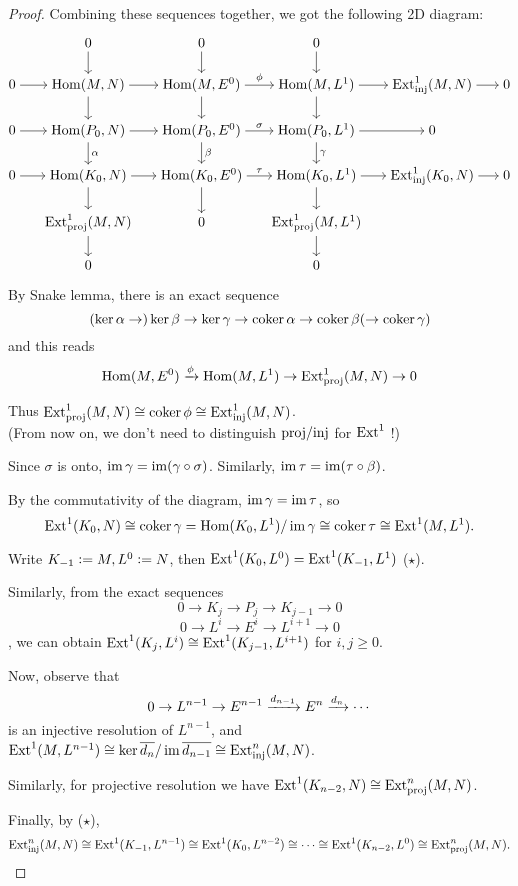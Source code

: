 \begin{theorem}
\begin{proof}
    Combining these sequences together, we got the following 2D diagram:

    $$
      \begin{tikzcd}[cramped, sep=15pt]
        & 0 \ar[d] & 0 \ar[d] & 0 \ar[d] \\
        0 \ar[r] & \Hom(M, N) \ar[r] \ar[d] & \Hom(M, E^0) \ar[r, "\phi"] \ar[d] &
        \Hom(M, L^1) \ar[r] \ar[d] & \Ext_\inj^1(M, N) \ar[r] & 0 \\
        0 \ar[r] & \Hom(P_0, N) \ar[r] \ar[d, "\alpha"] & \Hom(P_0, E^0) \ar[r, "\sigma"] \ar[d, "\beta"] &
        \Hom(P_0, L^1) \ar[r] \ar[d, "\gamma"] & 0 \\
        0 \ar[r] & \Hom(K_0, N) \ar[r] \ar[d] & \Hom(K_0, E^0) \ar[r, "\tau"] \ar[d] &
        \Hom(K_0, L^1) \ar[r] \ar[d] & \Ext_\inj^1(K_0, N) \ar[r] & 0 \\
        & \Ext_\proj^1(M, N) \ar[d] & 0 & \Ext_\proj^1(M, L^1) \ar[d] \\
        & 0 & & 0
      \end{tikzcd}
    $$

    By Snake lemma, there is an exact sequence
    $$(\ker \alpha \to )\ker \beta \to \ker \gamma \to \operatorname{coker} \alpha \to \operatorname{coker} \beta( \to \operatorname{coker} \gamma)$$
    and this reads
    $$\operatorname{Hom} (M, E^0) \xrightarrow{\phi} \operatorname{Hom}(M, L^1) \to \operatorname{Ext}_{\mathrm{proj}}^1(M, N) \to 0$$

    Thus $\operatorname{Ext}_{\mathrm{proj}}^1(M, N) \cong \operatorname{coker} \phi \cong \operatorname{Ext}_{\mathrm{inj}}^1(M, N)$.\\
    (From now on, we don't need to distinguish $\mathrm{proj} / \mathrm{inj}$ for $\operatorname{Ext}^1$ !)

    \vspace{10pt}

    Since $\sigma$ is onto, $\operatorname{im} \gamma = \operatorname{im} (\gamma \circ \sigma)$.
    Similarly, $\operatorname{im} \tau = \operatorname{im} (\tau \circ \beta)$.

    By the commutativity of the diagram, $\operatorname{im} \gamma = \operatorname{im} \tau$, so
    $$\operatorname{Ext}^1(K_0, N) \cong \operatorname{coker} \gamma = \operatorname{Hom}(K_0, L^1)/\operatorname{im} \gamma
    \cong \operatorname{coker} \tau \cong \operatorname{Ext}^1(M, L^1).$$

    Write $K_{-1} \vcentcolon= M, L^0 \vcentcolon= N$, then $\operatorname{Ext}^1(K_0, L^0) = \operatorname{Ext}^1(K_{-1}, L^1)$ ($\star$).

    Similarly, from the exact sequences
    $$ 0 \to K_j \to P_j \to K_{j-1} \to 0 $$
    $$ 0 \to L^i \to E^i \to L^{i+1} \to 0 $$,
    we can obtain $\operatorname{Ext}^1(K_j, L^i) \cong \operatorname{Ext}^1(K_{j-1}, L^{i+1})$ for $i, j \geq 0$.

    Now, observe that
    $$0 \to L^{n-1} \to E^{n-1} \xrightarrow{d_{n-1}} E^n \xrightarrow{d_n} \cdots$$
    is an injective resolution of $L^{n-1}$, and
    $\operatorname{Ext}^1(M, L^{n-1}) \cong \ker \overline{d_n} / \operatorname{im} \overline{d_{n-1}} \cong \operatorname{Ext}_{\mathrm{inj}}^n(M, N)$.

    Similarly, for projective resolution we have $\operatorname{Ext}^1(K_{n-2}, N) \cong \operatorname{Ext}_{\mathrm{proj}}^n(M, N)$.

    Finally, by ($\star$),  
    $$\operatorname{Ext}_{\mathrm{inj}}^n(M, N) \cong \operatorname{Ext}^1(K_{-1}, L^{n-1}) \cong \operatorname{Ext}^1(K_0, L^{n-2}) \cong \cdots
    \cong \operatorname{Ext}^1(K_{n-2}, L^0) \cong \operatorname{Ext}_{\mathrm{proj}}^n(M, N).$$

  \end{proof}
\end{theorem}

